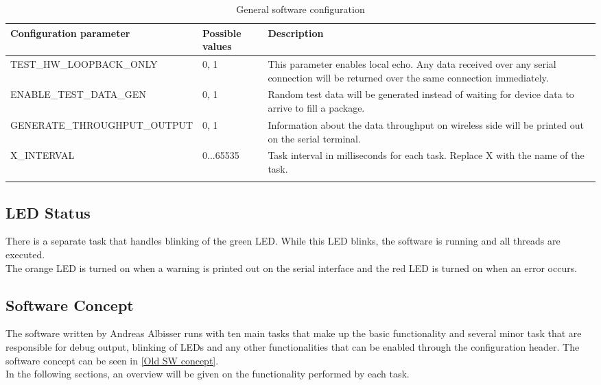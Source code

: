 \begin{center}
    \begin{longtable}{p{4cm}p{2cm}p{8cm}}
        \hline
        \textbf{Configuration parameter} & \textbf{Possible values} & \textbf{Description} \\
        \hline
        TEST\_HW\_LOOPBACK\_ONLY & 0, 1 & 
        This parameter enables local echo. Any data received over any serial connection will be returned over the same connection immediately.\\
        \hline
        ENABLE\_TEST\_DATA\_GEN &  0, 1 & 
        Random test data will be generated instead of waiting for device data to arrive to fill a package.\\
        \hline
        GENERATE\_THROUGHPUT\_OUTPUT &  0, 1 & 
        Information about the data throughput on wireless side will be printed out on the serial terminal.\\
        \hline
        X\_INTERVAL &  0...65535 & 
        Task interval in milliseconds for each task. Replace X with the name of the task. \\
        \hline
        \caption{General software configuration}
        \label{Specific config arduino}    
    \end{longtable}
\end{center}
%
%
\subsection{LED Status}
There is a separate task that handles blinking of the green LED. While this LED blinks, the software is running and all threads are executed.\\
The orange LED is turned on when a warning is printed out on the serial interface and the red LED is turned on when an error occurs.\\
%
\subsection{Software Concept}
The software written by Andreas Albisser runs with ten main tasks that make up the basic functionality and several minor task that are responsible for debug output, blinking of LEDs and any other functionalities that can be enabled through the configuration header. The software concept can be seen in \autoref{Old SW concept}. \\
%
In the following sections, an overview will be given on the functionality performed by each task.
